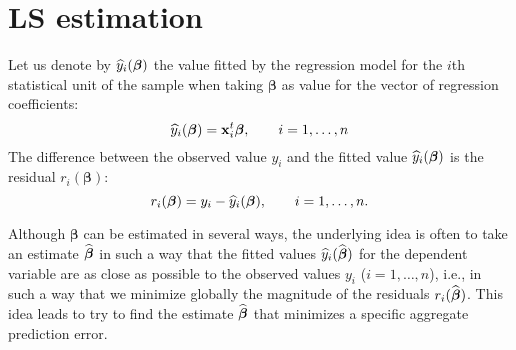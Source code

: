 \section{LS estimation}

Let us denote by $\widehat{y}_i(\boldsymbol\beta)$ the value fitted by the
regression model for the $i$th statistical unit of the sample when taking
$\boldsymbol\beta$ as value for the vector of regression coefficients:
\[
    \widehat{y}_i(\boldsymbol\beta)  = \mathbf x_i^t\boldsymbol\beta, 
    \qquad i = 1, \dots, n
\]
The difference between the observed value $y_i$ and the fitted value
$\widehat{y}_i(\boldsymbol\beta)$ is the residual $r_i(\boldsymbol\beta)$:
\[
    r_i(\boldsymbol\beta) = y_i - \widehat{y}_i(\boldsymbol\beta),
    \qquad i = 1, \dots, n.
\]

Although $\boldsymbol\beta$ can be estimated in several ways, the underlying
idea is often to take an estimate $\widehat{\boldsymbol\beta}$ in such a way that
the fitted values $\widehat{y}_i(\widehat{\boldsymbol\beta})$ for the dependent
variable are as close as possible to the observed values $y_i$ ($i = 1,
\dots, n$), i.e., in such a way that we minimize globally the magnitude of the
residuals $r_i(\widehat{\boldsymbol\beta})$. This idea leads to try to find the
estimate $\widehat{\boldsymbol\beta}$ that minimizes a specific aggregate
prediction error.

